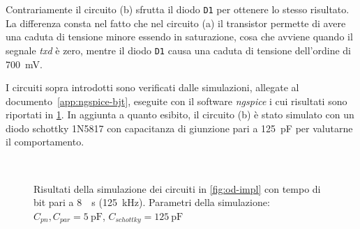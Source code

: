 Contrariamente il circuito (b) sfrutta il diodo \texttt{D1} per ottenere lo stesso risultato. La differenza consta nel fatto che nel circuito (a) il transistor permette di avere una caduta di tensione minore essendo in saturazione, cosa che avviene quando il segnale \textit{txd} è zero, mentre il diodo \texttt{D1} causa una caduta di tensione dell'ordine di \SI{700}{\milli\volt}.

I circuiti sopra introdotti sono verificati dalle simulazioni, allegate al documento~\ref{app:ngspice-bjt}, eseguite con il software \textit{ngspice}\cite{site:ngspice} i cui risultati sono riportati in \cref{graph:sim}. In aggiunta a quanto esibito, il circuito (b) è stato simulato con un diodo schottky 1N5817 con capacitanza di giunzione pari a \SI{125}{\pico\farad} per valutarne il comportamento.

\begin{figure}[hp]
    \centering
        \\
        \vfill
    \caption[]{Risultati della simulazione dei circuiti in \cref{fig:od-impl} con tempo di bit pari a \SI{8}{\text{\mu}\second} (\SI{125}{\kilo\hertz}). Parametri della simulazione: \(C_{pn}, C_{par} = \SI{5}{\pico\farad}\), \(C_{schottky} = \SI{125}{\pico\farad}\)}\label{graph:sim}
\end{figure}

